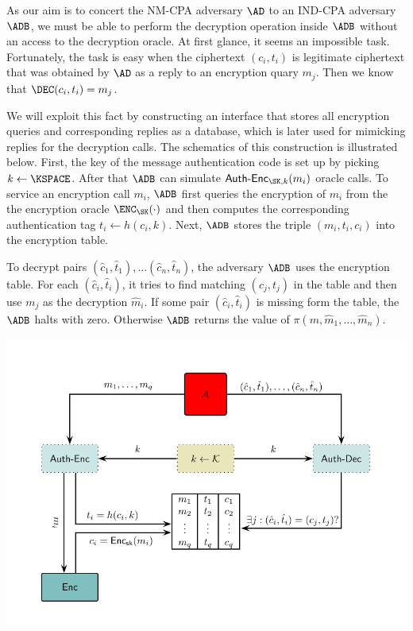 \documentclass{crypto-exercise}
\newcommand{\AENC}{\mathsf{Auth\text{-}Enc}}
\begin{document}
\begin{solution}
As our aim is to concert the NM-CPA adversary $\AD$ to an IND-CPA adversary $\ADB$, we must be able to perform the decryption operation inside $\ADB$ without an access to the decryption oracle. At first glance, it seems an impossible task. Fortunately, the task is easy when the ciphertext $(c_i,t_i)$ is legitimate ciphertext that was obtained by $\AD$ as a reply to an encryption quary $m_j$. Then we know that $\DEC(c_i,t_i)=m_j$.

We will exploit this fact by constructing an interface that stores all encryption queries and corresponding replies as a database, which is later used for mimicking replies for the decryption calls. The schematics of this construction is illustrated below. First, the key of the message authentication code is set up by picking $k\gets\KSPACE$. After that $\ADB$ can simulate $\AENC_{\SK,k}(m_i)$ oracle calls. To service an encryption call $m_i$, $\ADB$
first queries the encryption of $m_i$ from the the encryption oracle $\ENC_\SK(\cdot)$ and then computes the corresponding  authentication tag $t_i\gets h(c_i,k)$. Next, $\ADB$ stores the triple $(m_i,t_i,c_i)$ into the encryption table.

To decrypt pairs $(\hat{c}_1,\hat{t}_1),\ldots(\hat{c}_n,\hat{t}_n)$, the adversary $\ADB$ uses the encryption table. For each $(\hat{c}_i,\hat{t}_i)$, it tries to find matching $(c_j,t_j)$ in the table and then use $m_j$ as the decryption $\hat{m}_i$. If some pair $(\hat{c}_i,\hat{t}_i)$ is missing form the table, the $\ADB$ halts with zero. Otherwise $\ADB$ returns the value of $\pi(m,\hat{m}_1,\ldots,\hat{m}_n)$.

\begin{center}
\includegraphics{figures/0603-decryption-simulator}
\end{center}


\end{solution}
\end{document}
